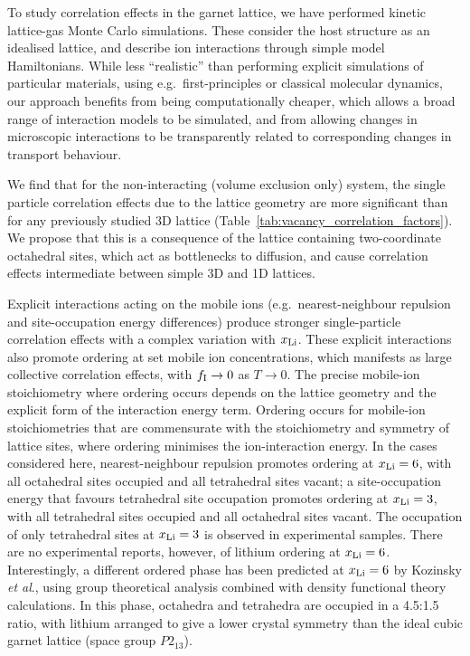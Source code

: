 \documentclass[aps,prb,twocolumn,superscriptaddress,reprint]{revtex4-1}
\newcommand{\xLi}{x_\m{Li}}
\begin{document}
To study correlation effects in the garnet lattice, we have performed kinetic lattice-gas Monte Carlo simulations.\cite{Morgan_JOSS2017} These consider the host structure as an idealised lattice, and describe ion interactions through simple model Hamiltonians. While less ``realistic'' than performing explicit simulations of particular materials, using e.g.\ first-principles or classical molecular dynamics,\cite{MeierEtAl_JPhysChemC2014,BurbanoEtAl_PhysRevLett2016} our approach benefits from being computationally cheaper, which allows a broad range of interaction models to be simulated, and from allowing changes in microscopic interactions to be transparently related to corresponding changes in transport behaviour.

We find that for the non-interacting (volume exclusion only) system, the single particle correlation effects due to the lattice geometry are more significant than for any previously studied 3D lattice (Table~\ref{tab:vacancy_correlation_factors}). We propose that this is a consequence of the lattice containing two-coordinate octahedral sites, which act as bottlenecks to diffusion, and cause correlation effects intermediate between simple 3D and 1D lattices. 

Explicit interactions acting on the mobile ions (e.g.\ nearest-neighbour repulsion and site-occupation energy differences) produce stronger single-particle correlation effects with a complex variation with $\xLi$. These explicit interactions also promote ordering at set mobile ion concentrations, which manifests as large collective correlation effects, with $f_{\mathrm{I}}\to0$ as $T\to0$.\cite{Murch_SolStatIonics1982} The precise mobile-ion stoichiometry where ordering occurs depends on the lattice geometry and the explicit form of the interaction energy term. Ordering occurs for mobile-ion stoichiometries that are commensurate with the stoichiometry and symmetry of lattice sites, where ordering minimises the ion-interaction energy. In the cases considered here, nearest-neighbour repulsion promotes ordering at $\xLi=6$, with all octahedral sites occupied and all tetrahedral sites vacant; a site-occupation energy that favours tetrahedral site occupation promotes ordering at $\xLi=3$, with all tetrahedral sites occupied and all octahedral sites vacant. The occupation of only tetrahedral sites at $\xLi=3$ is observed in experimental samples.\cite{OCallaghanEtAl_ChemMater2006} There are no experimental reports, however, of lithium ordering at $\xLi=6$. Interestingly, a different ordered phase has been predicted at $\xLi=6$ by Kozinsky 
\emph{et al}., using group theoretical analysis combined with density functional theory calculations.\cite{KozinskyEtAl_PhysRevLett2016} In this phase, octahedra and tetrahedra are occupied in a 4.5:1.5 ratio, with lithium arranged to give a lower crystal symmetry than the ideal cubic garnet lattice (space group $P2_13$). 
\end{document}

